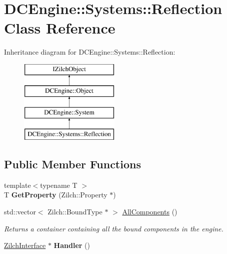 \hypertarget{classDCEngine_1_1Systems_1_1Reflection}{\section{D\-C\-Engine\-:\-:Systems\-:\-:Reflection Class Reference}
\label{classDCEngine_1_1Systems_1_1Reflection}
}
Inheritance diagram for D\-C\-Engine\-:\-:Systems\-:\-:Reflection\-:\begin{figure}[H]
\begin{center}
\leavevmode
\includegraphics[height=4.000000cm]{classDCEngine_1_1Systems_1_1Reflection}
\end{center}
\end{figure}
\subsection*{Public Member Functions}
\begin{DoxyCompactItemize}
\item 
\hypertarget{classDCEngine_1_1Systems_1_1Reflection_a63918208faaac0cbda2b2601f2af3fde}{{\footnotesize template$<$typename T $>$ }\\T {\bfseries Get\-Property} (Zilch\-::\-Property $\ast$)}\label{classDCEngine_1_1Systems_1_1Reflection_a63918208faaac0cbda2b2601f2af3fde}

\item 
\hypertarget{classDCEngine_1_1Systems_1_1Reflection_aef20390a7795ab81335f09d763923650}{std\-::vector$<$ Zilch\-::\-Bound\-Type $\ast$ $>$ \hyperlink{classDCEngine_1_1Systems_1_1Reflection_aef20390a7795ab81335f09d763923650}{All\-Components} ()}\label{classDCEngine_1_1Systems_1_1Reflection_aef20390a7795ab81335f09d763923650}

\begin{DoxyCompactList}\small\item\em Returns a container containing all the bound components in the engine. \end{DoxyCompactList}\item 
\hypertarget{classDCEngine_1_1Systems_1_1Reflection_afb758573a2eb0c8d168874456cc3dfb4}{\hyperlink{classDCEngine_1_1Systems_1_1ZilchInterface}{Zilch\-Interface} $\ast$ {\bfseries Handler} ()}\label{classDCEngine_1_1Systems_1_1Reflection_afb758573a2eb0c8d168874456cc3dfb4}

\end{DoxyCompactItemize}

